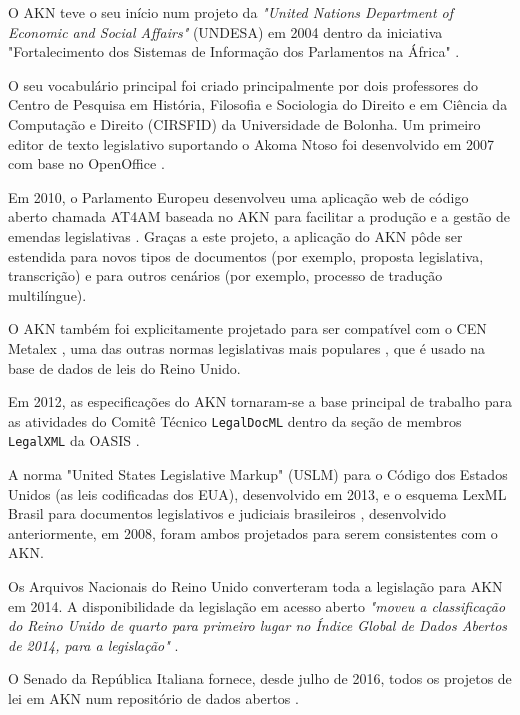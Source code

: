 O AKN teve o seu início num projeto da \emph{"United Nations Department of Economic and Social Affairs"} (UNDESA) 
em 2004 \cite{Barabucci2010} dentro da iniciativa "Fortalecimento dos Sistemas de Informação dos Parlamentos na África"
\cite{NairobiDeclaration2005}. 

O seu vocabulário principal foi criado principalmente por dois professores do Centro de Pesquisa em História, Filosofia e 
Sociologia do Direito e em Ciência da Computação e Direito (CIRSFID) da Universidade de Bolonha. 
Um primeiro editor de texto legislativo suportando o Akoma Ntoso foi desenvolvido em 2007 com base no OpenOffice 
\cite{Buie2012}.

Em 2010, o Parlamento Europeu desenvolveu uma aplicação web de código aberto chamada AT4AM \cite{Europarl2013, Bundestag2020} 
baseada no AKN \cite{VoxPopuLII} 
para facilitar a produção e a gestão de emendas legislativas \cite{AT4AMVideo, AT4AMWorld}. 
Graças a este projeto, a aplicação do AKN pôde ser estendida para novos tipos de documentos (por exemplo, 
proposta legislativa, transcrição) e para outros cenários (por exemplo, processo de tradução multilíngue).

O AKN também foi explicitamente projetado para ser compatível com o CEN Metalex \cite{CENMetaLex}, 
uma das outras normas legislativas 
mais populares \cite{AkomaNtosoUpdates2010}, que é usado na base de dados de leis do Reino Unido.

Em 2012, as especificações do AKN tornaram-se a base principal de trabalho para as atividades do Comitê Técnico 
\texttt{LegalDocML} dentro da seção de membros \texttt{LegalXML} da OASIS \cite{OASISLegalDocML}.

A norma "United States Legislative Markup" (USLM) \cite{USLMGuide2013} para o Código dos Estados Unidos (as leis codificadas dos EUA), 
desenvolvido em 2013, e o esquema LexML Brasil para documentos legislativos e judiciais brasileiros \cite{LexMLBrasil2008}, 
desenvolvido anteriormente, 
em 2008, foram ambos projetados para serem consistentes com o AKN.

Os Arquivos Nacionais do Reino Unido converteram toda a legislação para AKN em 2014. 
A disponibilidade da legislação em acesso aberto \emph{"moveu a classificação do Reino Unido de quarto para primeiro lugar no Índice Global 
de Dados Abertos de 2014, para a legislação"} \cite{OGPUKNAP2015}.

O Senado da República Italiana fornece, desde julho de 2016, 
todos os projetos de lei em AKN num repositório de dados abertos \cite{AkomaNtosoBulkData2016}.

